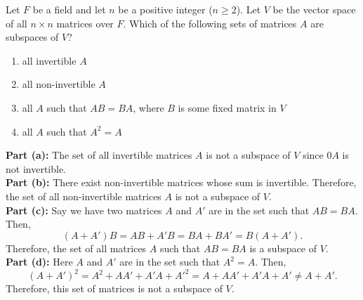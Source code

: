 \documentclass[11pt]{article}
\begin{document}
\begin{homeworkProblem}

    Let $F$ be a field and let $n$ be a positive integer ($n \geq 2$). Let $V$ be the vector space of all $n \times n$
    matrices over $F$. Which of the following sets of matrices $A$ are subspaces of $V$?
    \begin{enumerate}[label=(\alph*), topsep=5pt, itemsep=5pt]
        \item all invertible $A$
        \item all non-invertible $A$
        \item all $A$ such that $AB = BA$, where $B$ is some fixed matrix in $V$
        \item all $A$ such that $A^2 = A$ \newline
    \end{enumerate}
    \solution

    \textbf{Part (a):} The set of all invertible matrices $A$ is not a subspace of $V$ since $0A$ is not invertible. \\

    \textbf{Part (b):} There exist non-invertible matrices whose sum is invertible.
    Therefore, the set of all non-invertible matrices $A$ is not a subspace of $V$. \\

    \textbf{Part (c):} Say we have two matrices $A$ and $A'$ are in the set such that
    $AB = BA$. Then,
    \[
        (A + A')B = AB + A'B = BA + BA' = B(A + A').
    \]
    Therefore, the set of all matrices $A$ such that $AB = BA$ is a subspace of $V$. \\

    \textbf{Part (d):} Here $A$ and $A'$ are in the set such that $A^2 = A$. Then,
    \[
        (A + A')^2 = A^2 + AA' + A'A + A'^2 = A + AA' + A'A + A' \neq A + A'.
    \]
    Therefore, this set of matrices is not a subspace of $V$.

\end{homeworkProblem}

\pagebreak
\end{document}
